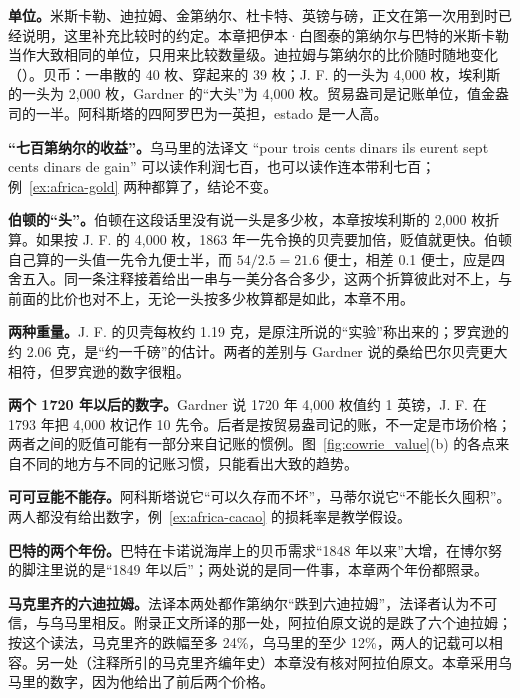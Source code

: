 \begin{deeper}[单位、史料与几处不一致]
\textbf{单位。}米斯卡勒、迪拉姆、金第纳尔、杜卡特、英镑与磅，正文在第一次用到时已经说明，这里补充比较时的约定。本章把伊本·白图泰的第纳尔与巴特的米斯卡勒当作大致相同的单位，只用来比较数量级。迪拉姆与第纳尔的比价随时随地变化（）。贝币：一串散的 40 枚、穿起来的 39 枚；J. F. 的一头为 4,000 枚，埃利斯的一头为 2,000 枚，Gardner 的“大头”为 4,000 枚。贸易盎司是记账单位，值金盎司的一半。阿科斯塔的四阿罗巴为一英担，estado 是一人高。

\textbf{“七百第纳尔的收益”。}乌马里的法译文 “pour trois cents dinars ils eurent sept cents dinars de gain” 可以读作利润七百，也可以读作连本带利七百；例~\ref{ex:africa-gold} 两种都算了，结论不变。

\textbf{伯顿的“头”。}伯顿在这段话里没有说一头是多少枚，本章按埃利斯的 2,000 枚折算。如果按 J. F. 的 4,000 枚，1863 年一先令换的贝壳要加倍，贬值就更快。伯顿自己算的一头值一先令九便士半，而 $54/2.5=21.6$ 便士，相差 0.1 便士，应是四舍五入。同一条注释接着给出一串与一美分各合多少，这两个折算彼此对不上，与前面的比价也对不上，无论一头按多少枚算都是如此，本章不用。

\textbf{两种重量。}J. F. 的贝壳每枚约 1.19 克，是原注所说的“实验”称出来的；罗宾逊的约 2.06 克，是“约一千磅”的估计。两者的差别与 Gardner 说的桑给巴尔贝壳更大相符，但罗宾逊的数字很粗。

\textbf{两个 1720 年以后的数字。}Gardner 说 1720 年 4,000 枚值约 1 英镑，J. F. 在 1793 年把 4,000 枚记作 10 先令。后者是按贸易盎司记的账，不一定是市场价格；两者之间的贬值可能有一部分来自记账的惯例。图~\ref{fig:cowrie_value}(b) 的各点来自不同的地方与不同的记账习惯，只能看出大致的趋势。

\textbf{可可豆能不能存。}阿科斯塔说它“可以久存而不坏”，马蒂尔说它“不能长久囤积”。两人都没有给出数字，例~\ref{ex:africa-cacao} 的损耗率是教学假设。

\textbf{巴特的两个年份。}巴特在卡诺说海岸上的贝币需求“1848 年以来”大增，在博尔努的脚注里说的是“1849 年以后”；两处说的是同一件事，本章两个年份都照录。

\textbf{马克里齐的六迪拉姆。}法译本两处都作第纳尔“跌到六迪拉姆”，法译者认为不可信，与乌马里相反。附录正文所译的那一处，阿拉伯原文说的是跌了六个迪拉姆\cite{vs2016}；按这个读法，马克里齐的跌幅至多 24\%，乌马里的至少 12\%，两人的记载可以相容。另一处（注释所引的马克里齐编年史）本章没有核对阿拉伯原文。本章采用乌马里的数字，因为他给出了前后两个价格。
\end{deeper}

